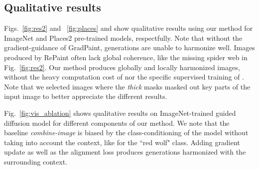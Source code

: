 


\subsection{Qualitative results}

Figs.~\ref{fig:res2} and ~\ref{fig:places} and  show qualitative results using our method for ImageNet and Places2 pre-trained models, respectfully. Note that without the gradient-guidance of GradPaint, generations are unable to harmonize well. Images produced by RePaint\cite{repaint} often lack global coherence, like the missing spider web in Fig.~\ref{fig:res2}. Our method produces globally and locally harmonized images, without the heavy computation cost of \cite{repaint} nor the specific supervised training of \cite{lama}. Note that we selected images where the \textit{thick} masks masked out key parts of the input image to better appreciate the different results.

Fig.~\ref{fig:vis_ablation} shows qualitative results on ImageNet-trained 
 guided diffusion model for different components of our method. We note that the baseline \emph{combine-image} is  biased by the class-conditioning of the model without taking into account the context, like for the ``red wolf" class. Adding gradient update as well as the alignment loss produces generations harmonized with the surrounding context. 






